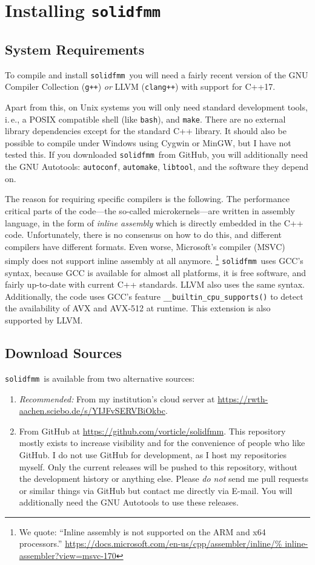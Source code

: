 \documentclass{scrbook}
\newcommand{\solidfmm}{\texttt{solidfmm}}
\begin{document}
\section{Installing \solidfmm}

\subsection{System Requirements}
To compile and install \solidfmm\ you will need a fairly recent version of the
GNU Compiler Collection (\lstinline|g++|) \emph{or} LLVM (\lstinline|clang++|)
with support for C++17. 

Apart from this, on Unix systems you will only need standard development tools,
i.\,e., a POSIX compatible shell (like \lstinline|bash|), and \lstinline|make|.
There are  no external library dependencies except for the standard C++ library.
It should also be possible to compile under Windows using Cygwin or MinGW, but I
have not tested this. If you downloaded \solidfmm\ from GitHub, you will
additionally need the GNU Autotools: \lstinline|autoconf|, \lstinline|automake|,
\lstinline|libtool|, and the software they depend on.

The reason for requiring specific compilers is the following. The performance
critical parts of the code---the so-called microkernels---are written in
assembly language, in the form of \emph{inline assembly} which is directly
embedded in the C++ code. Unfortunately, there is no consensus on how to do
this, and different compilers have different formats. Even worse, Microsoft's
compiler (MSVC) simply does not support inline assembly at all anymore.%
\footnote{We quote: \enquote{Inline assembly is not supported on the ARM and x64
processors.} \url{https://docs.microsoft.com/en-us/cpp/assembler/inline/%
inline-assembler?view=msvc-170}} \solidfmm\ uses GCC's syntax, because GCC is
available for almost all platforms, it is free software, and fairly up-to-date
with current C++ standards. LLVM also uses the same syntax. Additionally, the
code uses GCC's feature \lstinline|__builtin_cpu_supports()| to detect the
availability of AVX and AVX-512 at runtime. This extension is also supported by
LLVM. 


\subsection{Download Sources}
\solidfmm\ is available from two alternative sources:
\begin{enumerate}
\item\emph{Recommended:} From my institution's cloud server at
\url{https://rwth-aachen.sciebo.de/s/YIJFvSERVBiOkbc}.
\item From GitHub at \url{https://github.com/vorticle/solidfmm}. This repository
mostly exists to increase visibility and for the convenience of people who like
GitHub. I do not use GitHub for development, as I host my repositories myself.
Only the current releases will be pushed to this repository, without the
development history or anything else. Please \emph{do not} send me pull requests
or similar things via GitHub but contact me directly via E-mail. You will
additionally need the GNU Autotools to use these releases.
\end{enumerate}
\end{document}
